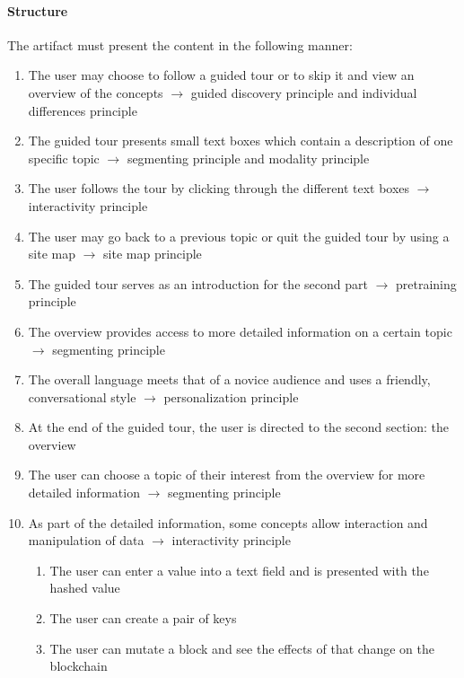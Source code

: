 \paragraph{Structure} The artifact must present the content in the following manner:
\begin{enumerate}[nosep]
\setcounter{enumi}{\value{foo}}
    \item The user may choose to follow a guided tour or to skip it and view an overview of the concepts $\rightarrow$ guided discovery principle and individual differences principle
    \item The guided tour presents small text boxes which contain a description of one specific topic $\rightarrow$ segmenting principle and modality principle
    \item The user follows the tour by clicking through the different text boxes $\rightarrow$ interactivity principle
    \item The user may go back to a previous topic or quit the guided tour by using a site map $\rightarrow$ site map principle
    \item The guided tour serves as an introduction for the second part $\rightarrow$ pretraining principle
    \item The overview provides access to more detailed information on a certain topic $\rightarrow$ segmenting principle
    \item The overall language meets that of a novice audience and uses a friendly, conversational style $\rightarrow$ personalization principle
    \item At the end of the guided tour, the user is directed to the second section: the overview
    \item The user can choose a topic of their interest from the overview for more detailed information $\rightarrow$ segmenting principle
    \item As part of the detailed information, some concepts allow interaction and manipulation of data $\rightarrow$ interactivity principle
    \begin{enumerate}
        \item The user can enter a value into a text field and is presented with the hashed value
        \item The user can create a pair of keys 
        \item The user can mutate a block and see the effects of that change on the blockchain
    \end{enumerate}
\setcounter{foo}{\value{enumi}}
\end{enumerate}

